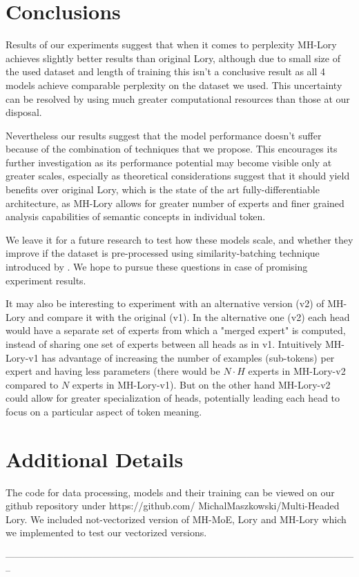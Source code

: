 \documentclass[12pt]{article}
\begin{document}
\section{Conclusions}

Results of our experiments suggest that when it comes to perplexity MH-Lory achieves slightly better results than original Lory, although due to small size of the used dataset and length of training this isn't a conclusive result as all 4 models achieve comparable perplexity on the dataset we used. This uncertainty can be resolved by using much greater computational resources than those at our disposal.

Nevertheless our results suggest that the model performance doesn't suffer because of the combination of techniques that we propose. This encourages its further investigation as its performance potential may become visible only at greater scales, especially as theoretical considerations suggest that it should yield benefits over original Lory, which is the state of the art fully-differentiable architecture, as MH-Lory allows for greater number of experts and finer grained analysis capabilities of semantic concepts in individual token.

We leave it for a future research to test how these models scale, and whether they improve if the dataset is pre-processed using similarity-batching technique introduced by \cite{shi2023context}. We hope to pursue these questions in case of promising experiment results.

It may also be interesting to experiment with an alternative version (v2) of MH-Lory and compare it with the original (v1). In the alternative one (v2) each head would have a separate set of experts from which a "merged expert" is computed, instead of sharing one set of experts between all heads as in v1. Intuitively MH-Lory-v1 has advantage of increasing the number of examples (sub-tokens) per expert and having less parameters (there would be $N \cdot H$ experts in MH-Lory-v2 compared to $N$ experts in MH-Lory-v1). But on the other hand MH-Lory-v2 could allow for greater specialization of heads, potentially leading each head to focus on a particular aspect of token meaning.


%


\printbibliography  

\appendix


\section{Additional Details}
The code for data processing, models and their training can be viewed on our github repository under https://github.com/
MichalMaszkowski/Multi-Headed Lory. We included not-vectorized version of MH-MoE, Lory and MH-Lory which we implemented to test our vectorized versions. 


% 
--------------------------------------------------------------------------------------------------------------
\end{document}
